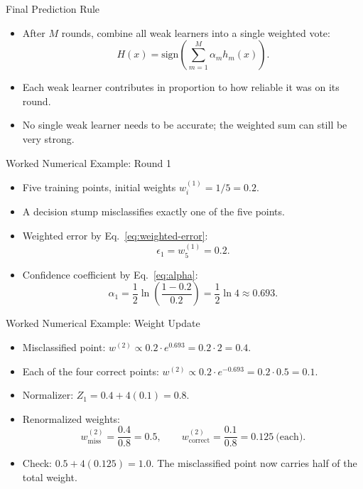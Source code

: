 \begin{frame}{Final Prediction Rule}
\begin{itemize}
  \item After $M$ rounds, combine all weak learners into a single weighted vote:
  \begin{equation}
    H(x) = \mathrm{sign}\!\left(\sum_{m=1}^{M}\alpha_m h_m(x)\right).
    \label{eq:final-prediction}
  \end{equation}
  \pause
  \item Each weak learner contributes in proportion to how reliable it was on its round.
  \pause
  \item No single weak learner needs to be accurate; the weighted sum can still be very strong.
\end{itemize}
\end{frame}

\begin{frame}{Worked Numerical Example: Round 1}
\small
\begin{itemize}
  \item Five training points, initial weights $w_i^{(1)} = 1/5 = 0.2$.
  \item A decision stump misclassifies exactly one of the five points.
  \pause
  \item Weighted error by Eq.~\eqref{eq:weighted-error}:
  \[
    \epsilon_1 = w_5^{(1)} = 0.2.
  \]
  \pause
  \item Confidence coefficient by Eq.~\eqref{eq:alpha}:
  \[
    \alpha_1 = \frac{1}{2}\ln\!\left(\frac{1-0.2}{0.2}\right) = \frac{1}{2}\ln 4 \approx 0.693.
  \]
\end{itemize}
\end{frame}

\begin{frame}{Worked Numerical Example: Weight Update}
\small
\begin{itemize}
  \item Misclassified point: $w^{(2)} \propto 0.2\cdot e^{0.693} = 0.2\cdot 2 = 0.4$.
  \item Each of the four correct points: $w^{(2)} \propto 0.2\cdot e^{-0.693} = 0.2\cdot 0.5 = 0.1$.
  \pause
  \item Normalizer: $Z_1 = 0.4 + 4(0.1) = 0.8$.
  \pause
  \item Renormalized weights:
  \[
    w_{\text{miss}}^{(2)} = \frac{0.4}{0.8} = 0.5,
    \qquad
    w_{\text{correct}}^{(2)} = \frac{0.1}{0.8} = 0.125 \ \text{(each)}.
  \]
  \pause
  \item Check: $0.5 + 4(0.125) = 1.0$. The misclassified point now carries half of the total weight.
\end{itemize}
\end{frame}

